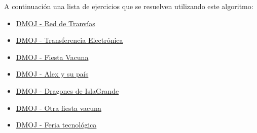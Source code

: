 A continuación una lista de ejercicios que se resuelven utilizando este algoritmo:

\begin{itemize}
	\item \href{https://dmoj.uclv.edu.cu/problem/tran} {DMOJ - Red de Tranvías} 
	\item \href{https://dmoj.uclv.edu.cu/problem/etransfer} {DMOJ - Transferencia Electrónica}
	\item \href{https://dmoj.uclv.edu.cu/problem/bparty} {DMOJ - Fiesta Vacuna}
	\item \href{https://dmoj.uclv.edu.cu/problem/alexpais}{DMOJ - Alex y su país}
	\item \href{https://dmoj.uclv.edu.cu/problem/dragones/rank/}{DMOJ - Dragones de IslaGrande}
	\item \href{https://dmoj.uclv.edu.cu/problem/sparty} {DMOJ - Otra fiesta vacuna}
	\item \href{https://dmoj.uclv.edu.cu/problem/feria} {DMOJ - Feria tecnológica}
\end{itemize}